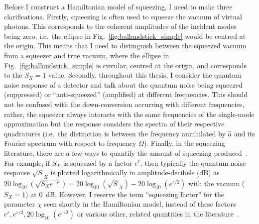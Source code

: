Before I construct a Hamiltonian model of squeezing, I need to make three clarifications. %
Firstly, squeezing is often used to squeeze the vacuum of virtual photons. %
This corresponds to the coherent amplitudes of the incident modes being zero, i.e.\ the ellipse in Fig.~\ref{fig:ballandstick_simple} would be centred at the origin. This means that I need to distinguish between the squeezed vacuum from a squeezer and true vacuum, where the ellipse in Fig.~\ref{fig:ballandstick_simple} is circular, centred at the origin, and corresponds to the $S_X=1$ value. 
Secondly, throughout this thesis, I consider the quantum noise response of a detector and talk about the quantum noise being squeezed (suppressed) or ``anti-squeezed'' (amplified) at different frequencies. This should not be confused with the down-conversion occurring with different frequencies, rather, the squeezer always interacts with the same frequencies of the single-mode approximation but the response considers the spectra of their respective quadratures (i.e.\ the distinction is between the frequency annihilated by ${\hat a}$ and its Fourier spectrum with respect to frequency $\Omega$). Finally, in the squeezing literature, there are a few ways to quantify the amount of squeezing produced~\cite{}. For example, if $S_X$ is squeezed by a factor $e^r$, then typically the quantum noise response $\sqrt S_X$ is plotted logarithmically in amplitude-decibels (dB) as $20 \log_{10}(\sqrt {S_X e^{-r}})=20 \log_{10}(\sqrt S_X) - 20\log_{10}(e^{r/2})$ with the vacuum ($S_X=1$) at $0$~dB. However, I reserve the term ``squeezing factor'' for the parameter $\chi$ seen shortly in the Hamiltonian model, instead of these factors $e^r, e^{r/2}, 20\log_{10}(e^{r/2})$ or various other, related quantities in the literature~\cite{}.



